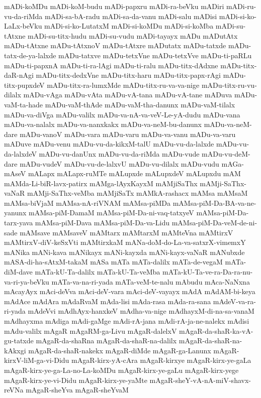 {mADi-koMDu
mADi-koM-budu
mADi-papxru
mADi-ra-beVku
mADiri
mADi-ru-vu-da-riMda
mADi-sa-bA-radu
mADi-sa-da-vanu
mADi-salu
mADisi
mADi-si-ko-LaLx-beVku
mADi-si-ko-LutatxM
mADi-si-koMDu
mADi-si-koMba
mADi-su-tAtxne
mADi-su-titx-hudu
mADi-su-vudu
mADi-tayayx
mADu
mADutAtx
mADu-tAtxne
mADu-tAtxnoV
mADu-tAtxre
mADutatx
mADu-tatxde
mADu-tatx-de-ya-lalxde
mADu-tatxve
mADu-tetxVne
mADu-tetxVve
mADu-ti-paRLu
mADu-ti-papxnA
mADu-ti-ra-lAgi
mADu-ti-ralu
mADu-titx-dAdxne
mADu-titx-daR-nAgi
mADu-titx-dedxVne
mADu-titx-haru
mADu-titx-papx-rAgi
mADu-titx-pupxdeV
mADu-titx-ra-lumxMde
mADu-titx-ru-va-va-nige
mADu-titx-ru-vu-dilalx
mADu-vAga
mADu-vAta
mADu-vA-tana
mADu-vA-tane
mADuva
mADu-vaM-ta-hade
mADu-vaM-thAde
mADu-vaM-tha-danunx
mADu-vaM-tilalx
mADu-va-diVga
mADu-valilx
mADu-va-nA-va-veV-Le-yA-dudu
mADu-vana
mADu-va-nalalx
mADu-va-nanxkakx
mADu-va-neM-bu-danunx
mADu-va-neM-dare
mADu-vanoV
mADu-vara
mADu-varu
mADu-va-vanu
mADu-va-varu
mADuve
mADu-venu
mADu-vu-da-kikxM-talU
mADu-vu-da-lalxde
mADu-vu-da-lalxdeV
mADu-vu-danUnx
mADu-vu-da-riMda
mADu-vude
mADu-vu-deM-dare
mADu-vudeV
mADu-vu-de-lalxvU
mADu-vu-dilalx
mADu-vudu
mAGa-mAseV
mALapx
mALapx-ruMTe
mALupxde
mALupxdeV
mALupxdu
mAM
mAMda-Li-biR-lavx-patirx
mAMga-lAyxKayxM
mAMjiSaThx
mAMji-SaThx-vaNaR
mAMji-SaThx-veMba
mAMjiSaTx
mAMkA-rashacx
mAMsa
mAMsaM
mAMsa-biVjaM
mAMsa-nA-riVNAM
mAMsa-piMDa
mAMsa-piM-Da-BA-va-ne-yanunx
mAMsa-piM-DamaM
mAMsa-piM-Da-ni-vaq-tatxyeV
mAMsa-piM-Da-tarx-yava
mAMsa-piM-Dava
mAMsa-piM-Da-va-Lidu
mAMsa-piM-Da-veM-de-ni-sade
mAMsave
mAMsaveV
mAMtarx
mAMtarxM
mAMteVna
mAMtirxV
mAMtirxV-diV-keSxVti
mAMtirxkaM
mANa-doM-do-La-va-satxrX-vimemxY
mANika
mANi-kava
mANikayx
mANi-kayxda
mANi-kayx-vaNaR
mANubxde
mASA-di-ha-sAtxM-takaM
mASa
mATa
mATa-dalilx
mATa-de-vegaM
mATa-diM-dave
mATa-kU-Ta-dalilx
mATa-kU-Ta-veMba
mATa-kU-Ta-ve-ra-Da-ra-nu-va-ri-ya-beVku
mATa-va-na-ri-yada
mATa-veM-te-nalu
mAbudu
mAca-NaNxna
mAcayAyx
mAci-deVva
mAci-deV-vara
mAci-deV-vayayx
mAdA
mAdAM-bi-keya
mAdAce
mAdAra
mAdaRvaM
mAda-lisi
mAda-rasa
mAda-ra-sana
mAdeV-va-ra-ri-yada
mAdeVvi
mAdhAyx-hanxkeV
mAdha-va-nige
mAdhayxM-di-na-sa-vanaM
mAdhayxma
mAdiga
mAdi-gaMge
mAdi-rA-jana
mAdi-rA-ja-ne-nalekx
mAdisi
mAdu-valilx
mAgaR
mAgaRM-ga-Livu
mAgaR-dalelxV
mAgaR-da-shaR-ka-vA-gu-tatxde
mAgaR-da-shaRna
mAgaR-da-shaR-na-dalilx
mAgaR-da-shaR-na-kAkxgi
mAgaR-da-shaR-nakekx
mAgaR-diMde
mAgaR-ga-Lanunx
mAgaR-kirxV-liM-ga-vi-Didu
mAgaR-kirx-yA-cAra
mAgaR-kirxye
mAgaR-kirx-ye-gaLa
mAgaR-kirx-ye-ga-La-no-La-koMDu
mAgaR-kirx-ye-gaLu
mAgaR-kirx-yege
mAgaR-kirx-ye-vi-Didu
mAgaR-kirx-ye-yaMte
mAgaR-sheY-vA-nA-miV-shavx-reVNa
mAgaR-sheYva
mAgaR-sheYvaM
}
